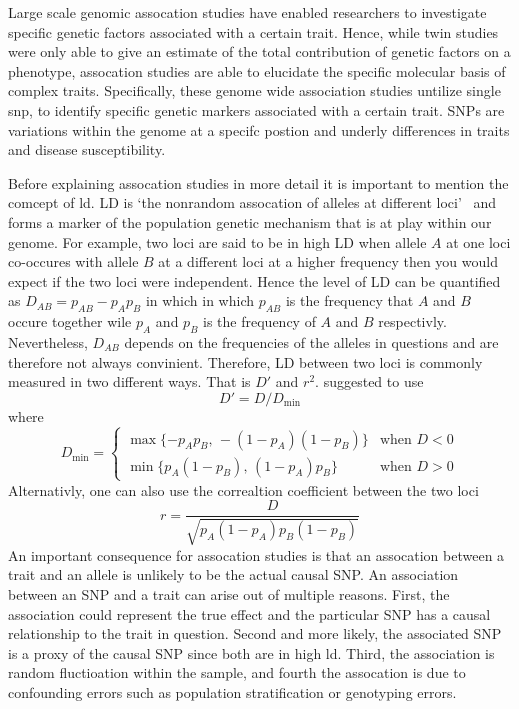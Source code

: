 Large scale genomic assocation studies have enabled researchers to investigate specific genetic factors associated with a certain trait.
Hence, while twin studies were only able to give an estimate of the total contribution of genetic factors on a phenotype, assocation studies are able to elucidate the specific molecular basis of complex traits.
Specifically, these genome wide association studies untilize single \acrfull{snp}, to identify specific genetic markers associated with a certain trait.
SNPs are variations within the genome at a specifc postion and underly differences in traits and disease susceptibility. 

Before explaining assocation studies in more detail it is important to mention the comcept of \acrfull{ld}.
LD is `the nonrandom assocation of alleles at different loci'~\cite{Slatkin2008} and forms a marker of the population genetic mechanism that is at play within our genome.
For example, two loci are said to be in high LD when allele $A$ at one loci co-occures with allele $B$ at a different loci at a higher frequency then you would expect if the two loci were independent.
Hence the level of LD can be quantified as $D_{AB}=p_{AB} - p_{A}p_{B}$ in which in which $p_{AB}$ is the frequency that $A$ and $B$ occure together wile $p_A$ and $p_B$ is the frequency of $A$ and $B$ respectivly.
Nevertheless, $D_{AB}$ depends on the frequencies of the alleles in questions and are therefore not always convinient.
Therefore, LD between two loci is commonly measured in two different ways. 
That is $D'$ and $r^2$.
\citet{Lewontin1964} suggested to use
\begin{equation}\label{eq:dprime}
  D' = D/D_{\min}
\end{equation}
where 
\begin{equation*}
  D_{\min}= \begin{cases}
    \max\{-p_A p_B,\,-(1-p_A)(1-p_B)\} & \text{when } D < 0\\
    \min\{p_A (1-p_B),\,(1-p_A) p_B\} & \text{when } D > 0
  \end{cases} 
\end{equation*}
Alternativly, one can also use the correaltion coefficient between the two loci 
\begin{equation}\label{eq:r2}
  r=\frac{D}{\sqrt{p_A(1-p_A)p_B (1-p_B)}}
\end{equation}
An important consequence for assocation studies is that an assocation between a trait and an allele is unlikely to be the actual causal SNP\@.
An association between an SNP and a trait can arise out of multiple reasons.
First, the association could represent the true effect and the particular SNP has a causal relationship to the trait in question.
Second and more likely, the associated SNP is a proxy of the causal SNP since both are in high \acrfull{ld}.
Third, the association is random fluctioation within the sample, and fourth the assocation is due to confounding errors such as population stratification or genotyping errors.

